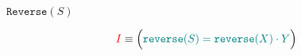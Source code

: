 
\begin{frame}{}
  \begin{exampleblock}{$\texttt{Reverse}(S)$}
  \end{exampleblock}

  \pause
  \[
    \textcolor{red}{I} \equiv \Big(\textcolor{teal}{\texttt{reverse}(S) = \texttt{reverse}(X) \cdot Y} \Big)
  \]
\end{frame}
